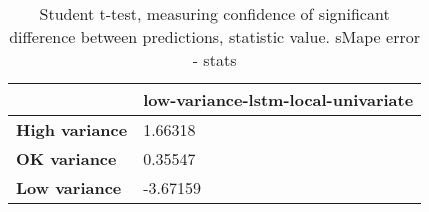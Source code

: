 \begin{table}[h]
\centering
\caption{Student t-test, measuring confidence of significant difference between predictions, statistic value. sMape error - stats}
\label{table:ttest-stats-variance-experiments-sMAPE}
\begin{tabular}{ll}
\toprule
{} & low-variance-lstm-local-univariate \\
\midrule
\textbf{High variance} &                            1.66318 \\
\textbf{OK variance  } &                            0.35547 \\
\textbf{Low variance } &                           -3.67159 \\
\bottomrule
\end{tabular}
\end{table}
